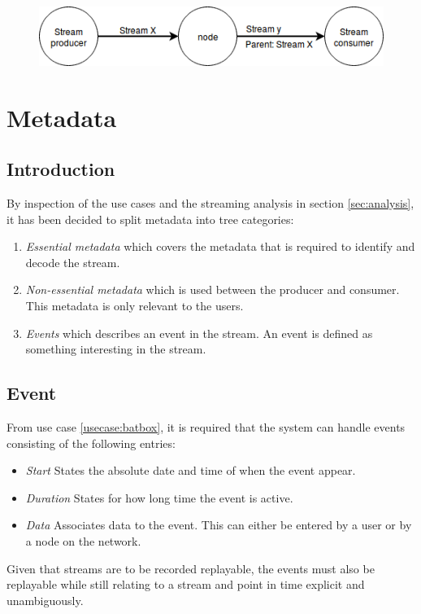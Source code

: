\begin{figure}
	\includegraphics[width=1\textwidth]{figures/stream-graph}
\end{figure}

\section{Metadata}
\subsection{Introduction}

By inspection of the use cases and the streaming analysis in section \ref{sec:analysis}, it has been decided to split metadata into tree categories:
\begin{enumerate}
	\item \textit{Essential metadata} which covers the metadata that is required to identify and decode the stream.
	\item \textit{Non-essential metadata} which is used between the producer and consumer. This metadata is only relevant to the users.
	\item \textit{Events} which describes an event in the stream. An event is defined as something interesting in the stream.
\end{enumerate}

\subsection{Event}
From use case \ref{usecase:batbox}, it is required that the system can handle events consisting of the following entries:
\begin{itemize}
	\item \textit{Start} States the absolute date and time of when the event appear. 
	\item \textit{Duration} States for how long time the event is active.
	\item \textit{Data} Associates data to the event. This can either be entered by a user or by a node on the network.
\end{itemize}

Given that streams are to be recorded replayable, the events must also be replayable while still relating to a stream and point in time explicit and unambiguously.

